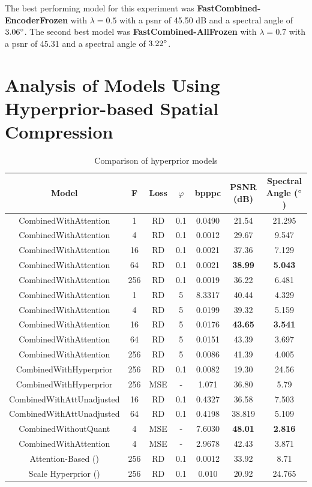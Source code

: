 The best performing model for this experiment was \textbf{FastCombined-EncoderFrozen} with $\lambda=0.5$ with a \ac{psnr} of 45.50 dB and a spectral angle of $3.06 \degree$. The second best model was \textbf{FastCombined-AllFrozen} with $\lambda=0.7$ with a \ac{psnr} of 45.31 and a spectral angle of $3.22 \degree$.

\section{Analysis of Models Using Hyperprior-based Spatial Compression\label{sec:ch5hyperprior}}
\begin{table}
\centering
\begin{tabular}{|c|c|c|c|c|c|c|}
\hline
Model & F & Loss &$\varphi$ & bpppc & PSNR (dB) & Spectral Angle ($\degree$) \\
\hline\hline
CombinedWithAttention & 1 & RD & 0.1 & 0.0490 & 21.54 & 21.295 \\
\hline
CombinedWithAttention & 4 & RD & 0.1 & 0.0012 & 29.67 & 9.547 \\
\hline
CombinedWithAttention & 16 & RD & 0.1 & 0.0021 & 37.36 & 7.129 \\
\hline
CombinedWithAttention & 64 & RD & 0.1 & 0.0021 & \textbf{38.99} & \textbf{5.043} \\
\hline
CombinedWithAttention & 256 & RD & 0.1 & 0.0019 & 36.22 & 6.481 \\
\hline
CombinedWithAttention & 1 & RD & 5 & 8.3317 & 40.44 & 4.329 \\
\hline
CombinedWithAttention & 4 & RD & 5 & 0.0199 & 39.32 & 5.159 \\
\hline
CombinedWithAttention & 16 & RD & 5 & 0.0176 & \textbf{43.65} & \textbf{3.541} \\
\hline
CombinedWithAttention & 64 & RD & 5 & 0.0151 & 43.39 & 3.697 \\
\hline
CombinedWithAttention & 256 & RD & 5 & 0.0086 & 41.39 & 4.005 \\
\hline
CombinedWithHyperprior & 256 & RD & 0.1 & 0.0082 & 19.30 & 24.56 \\
\hline
CombinedWithHyperprior & 256 & MSE & - & 1.071 & 36.80 & 5.79 \\
\hline
CombinedWithAttUnadjusted & 16 & RD & 0.1 & 0.4327 & 36.58 & 7.503 \\
\hline
CombinedWithAttUnadjusted & 64 & RD & 0.1 & 0.4198 & 38.819 & 5.109 \\
\hline
CombinedWithoutQuant & 4 & MSE & - & 7.6030 & \textbf{48.01} & \textbf{2.816} \\
\hline
CombinedWithAttention & 4 & MSE & - & 2.9678 & 42.43 & 3.871 \\
\hline
Attention-Based (\citep{cheng_learned_2020}) & 256 & RD & 0.1 & 0.0012 & 33.92 & 8.71 \\
\hline
Scale Hyperprior (\citep{balle_variational_2018}) & 256 & RD & 0.1 & 0.010 & 20.92 & 24.765 \\
\hline
\end{tabular}
\caption{Comparison of hyperprior models}
\label{fig:hyperpriorcomp}
\end{table}

